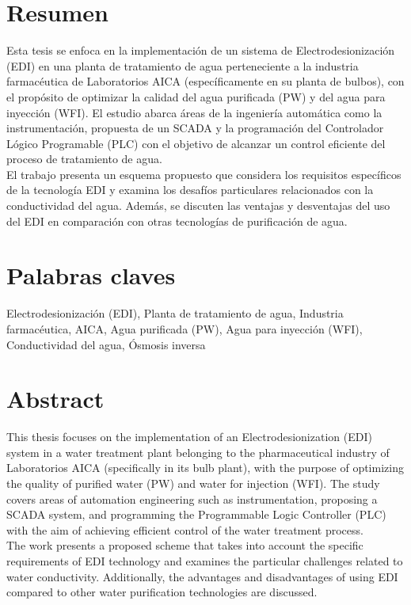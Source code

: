 \documentclass[
	spanish, %
	letterpaper, oneside
]{book}
\begin{document}
\templatePortrait

\templatePagecfg

\newcommand{\keywords}[1]{\par\noindent #1}
\newcommand{\abstracttext}[1]{\par #1}

\newpage
\section*{Resumen}
\abstracttext{
	Esta tesis se enfoca en la implementación de un sistema de Electrodesionización (EDI)
	en una planta de tratamiento de agua perteneciente a la industria farmacéutica de
	Laboratorios AICA (específicamente en su planta de bulbos), con el propósito de optimizar la calidad del agua purificada (PW)
	y del agua para inyección (WFI). El estudio abarca áreas de la ingeniería automática como
	la instrumentación, propuesta de un SCADA y la programación
	del Controlador Lógico Programable (PLC) con el objetivo de alcanzar un control
	eficiente del proceso de tratamiento de agua.\\

	El trabajo presenta un esquema propuesto que considera los requisitos específicos de la tecnología EDI y examina los desafíos
	particulares relacionados con la conductividad del agua. Además, se discuten las ventajas y desventajas del uso del EDI en
	comparación con otras tecnologías de purificación de agua.\\}

\section*{Palabras claves}
\keywords{Electrodesionización (EDI), Planta de tratamiento de agua, Industria farmacéutica, AICA, Agua purificada (PW), Agua para inyección (WFI), Conductividad del agua, Ósmosis inversa  }

\newpage
\section*{Abstract}
\abstracttext{
	This thesis focuses on the implementation of an Electrodesionization (EDI) system in a water treatment plant belonging to the pharmaceutical industry of Laboratorios AICA (specifically in its bulb plant), with the purpose of optimizing the quality of purified water (PW) and water for injection (WFI). The study covers areas of automation engineering such as instrumentation, proposing a SCADA system, and programming the Programmable Logic Controller (PLC) with the aim of achieving efficient control of the water treatment process.\\

	The work presents a proposed scheme that takes into account the specific requirements of EDI technology and examines the particular challenges related to water conductivity. Additionally, the advantages and disadvantages of using EDI compared to other water purification technologies are discussed.\\

}
\end{document}
